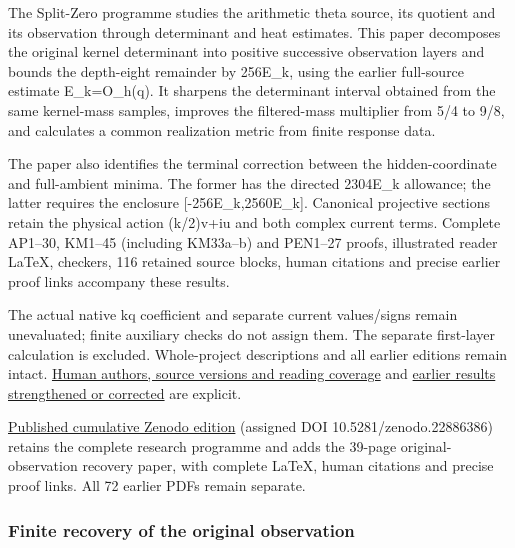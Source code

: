 \documentclass[
]{article}
\begin{document}
The Split-Zero programme studies the arithmetic theta source, its
quotient and its observation through determinant and heat estimates.
This paper decomposes the original kernel determinant into positive
successive observation layers and bounds the depth-eight remainder by
256E\_k, using the earlier full-source estimate E\_k=O\_h(q). It
sharpens the determinant interval obtained from the same kernel-mass
samples, improves the filtered-mass multiplier from 5/4 to 9/8, and
calculates a common realization metric from finite response data.

The paper also identifies the terminal correction between the
hidden-coordinate and full-ambient minima. The former has the directed
2304E\_k allowance; the latter requires the enclosure
{[}-256E\_k,2560E\_k{]}. Canonical projective sections retain the
physical action (k/2)v+iu and both complex current terms. Complete
AP1--30, KM1--45 (including KM33a--b) and PEN1--27 proofs, illustrated
reader LaTeX, checkers, 116 retained source blocks, human citations and
precise earlier proof links accompany these results.

The actual native kq coefficient and separate current values/signs
remain unevaluated; finite auxiliary checks do not assign them. The
separate first-layer calculation is excluded. Whole-project descriptions
and all earlier editions remain intact.
\href{https://github.com/KokunoYumeto/zeta-function-research-reader/blob/main/workbenches/splitzero-tandem/continuations/20260922-arithmetic-probe-mass/SOURCE_READING_USE.md}{Human
authors, source versions and reading coverage} and
\href{https://github.com/KokunoYumeto/zeta-function-research-reader/blob/main/workbenches/splitzero-tandem/continuations/20260922-arithmetic-probe-mass/RECEIVER_UPDATES.md}{earlier
results strengthened or corrected} are explicit.

\href{https://zenodo.org/records/22886386}{Published cumulative Zenodo
edition} (assigned DOI 10.5281/zenodo.22886386) retains the complete
research programme and adds the 39-page original-observation recovery
paper, with complete LaTeX, human citations and precise proof links. All
72 earlier PDFs remain separate.

\subsubsection{Finite recovery of the original
observation}\label{finite-recovery-of-the-original-observation}
\end{document}
